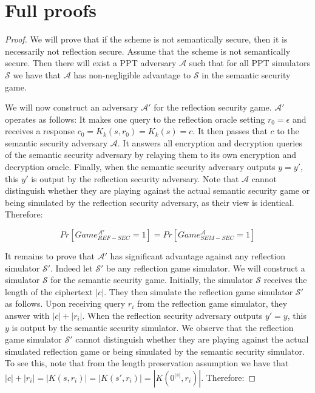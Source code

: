 \section{Full proofs}

\begin{lemma}
\end{lemma}

\begin{proof}
    We will prove that if the scheme is not semantically secure, then it is
    necessarily not reflection secure. Assume that the scheme is not
    semantically secure. Then there will exist a PPT adversary $\mathcal{A}$
    such that for all PPT simulators $\mathcal{S}$ we have that $\mathcal{A}$
    has non-negligible advantage to $\mathcal{S}$ in the semantic security game.

    We will now construct an adversary $\mathcal{A'}$ for the reflection
    security game. $\mathcal{A'}$ operates as follows: It makes one query to
    the reflection oracle setting $r_0 = \epsilon$ and receives a response $c_0
    = K_k(s, r_0) = K_k(s) = c$. It then passes that $c$ to the semantic
    security adversary $\mathcal{A}$. It answers all encryption and decryption
    queries of the semantic security adversary by relaying them to its own
    encryption and decryption oracle. Finally, when the semantic security
    adversary outputs $y = y'$, this $y'$ is output by the reflection security
    adversary. Note that $\mathcal{A}$ cannot distinguish whether they are
    playing against the actual semantic security game or being simulated by the
    reflection security adversary, as their view is identical. Therefore:

    \begin{equation}
        Pr[Game_{REF-SEC}^{\mathcal{A'}} = 1] = Pr[Game_{SEM-SEC}^{\mathcal{A}} = 1]
    \end{equation}

    It remains to prove that $\mathcal{A'}$ has significant advantage against
    any reflection simulator $\mathcal{S'}$. Indeed let $\mathcal{S'}$ be any
    reflection game simulator. We will construct a simulator $\mathcal{S}$ for
    the semantic security game. Initially, the simulator $\mathcal{S}$ receives
    the length of the ciphertext $|c|$. They then simulate the reflection game
    simulator $\mathcal{S'}$ as follows. Upon receiving query $r_i$ from the
    reflection game simulator, they answer with $|c| + |r_i|$. When the
    reflection security adversary outputs $y' = y$, this $y$ is output by the
    semantic security simulator. We observe that the reflection game simulator
    $\mathcal{S'}$ cannot distinguish whether they are playing against the
    actual simulated reflection game or being simulated by the semantic
    security simulator. To see this, note that from the length preservation
    assumption we have that $|c| + |r_i| = |K(s, r_i)| = |K(s', r_i)| =
    |K(0^{|s|}, r_i)|$. Therefore:


\end{proof}
